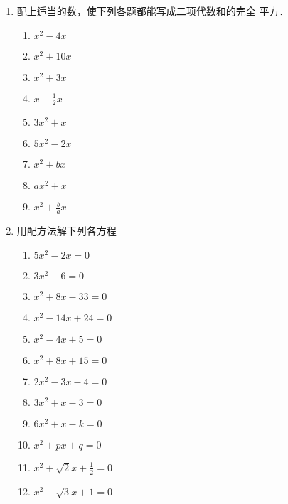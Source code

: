 \begin{enumerate}
\item 配上适当的数，使下列各题都能写成二项代数和的完全
平方．
    \begin{multicols}{2}
        \begin{enumerate}
\item $x^2-4x$
\item $x^2+10x$
\item $x^2+3x$
\item $x-\frac{1}{2}x$
\item $3x^2+x$
\item $5x^2-2x$
\item $x^2+bx$
\item $ ax^2+x$
\item $x^2+\frac{b}{a}x$
\end{enumerate}
\end{multicols}
\item 用配方法解下列各方程
\begin{multicols}{2}
    \begin{enumerate}
\item $5x^2-2x=0$
\item $3x^2-6=0$
\item $x^2+8x-33=0$
\item $x^2-14x+24=0$
\item $x^2-4x+5=0$
\item $x^2+8x+15=0$
\item $2x^2-3x-4=0$
\item $3x^2+x-3=0$
\item $6x^2+x-k=0$
\item $x^2+px+q=0$
\item $x^2+\sqrt{2}x+\frac{1}{2}=0$
\item $x^2-\sqrt{3}x+1=0$
        \end{enumerate}
    \end{multicols}


\end{enumerate}
